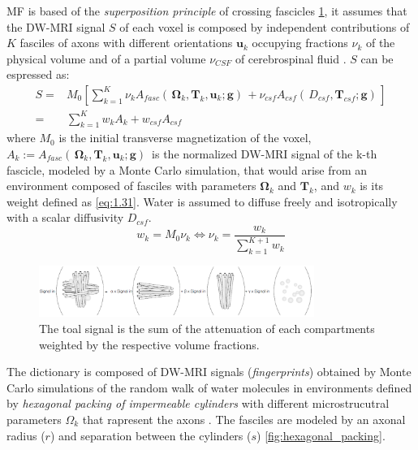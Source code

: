 MF is based of the \emph{superposition principle} of crossing fascicles \ref{fig:superposition}, it assumes that the DW-MRI signal $S$ of each voxel is composed by independent contributions of $K$ fasciles of axons with different orientations $\mathbf{u}_k$ occupying fractions $\nu_k$ of the physical volume and of a partial volume $\nu_{CSF}$ of cerebrospinal fluid \cite{rensonnet2019towards}. $S$ can be espressed as:
 \begin{equation}
  \begin{aligned}
   S ={} & M_0 \left[ \sum_{k=1}^{K} \nu_k A_{fasc} ( \,\mathbf{\Omega}_k,\mathbf{T}_k,\mathbf{u}_k;\mathbf{g}) \, + \nu_{csf} A_{csf}( \,D_{csf}, \mathbf{T}_{csf};\mathbf{g}) \, \right] \\
    = & \sum_{k=1}^{K} w_k A_k + w_{csf}A_{csf} 
  \end{aligned}
 \end{equation}
 where $M_0$ is the initial transverse magnetization of the voxel, $A_k := A_{fasc} ( \,\mathbf{\Omega}_k,\mathbf{T}_k,\mathbf{u}_k;\mathbf{g}) \,$ is the normalized DW-MRI signal of the k-th fascicle, modeled by a Monte Carlo simulation, that would arise from an environment composed of fasciles with parameters $\mathbf{\Omega}_k$ and $\mathbf{T}_k$, and $w_k$ is its weight defined as \ref{eq:1.31}. Water is assumed to diffuse freely and isotropically with a scalar diffusivity $D_{csf}$.
 \begin{equation}\label{eq:1.31}
   w_k = M_0\nu_k \iff \nu_k = \frac{w_k}{\sum_{k=1}^{K+1} w_k}
 \end{equation}

  \begin{figure}[h]
   \centering
   \includegraphics[width=0.8\textwidth]{images/superPosition.png}
   \caption{The toal signal is the sum of the attenuation of each compartments weighted by the respective volume fractions. \cite{rensonnet2015}}
   \label{fig:superposition}
 \end{figure}

 The dictionary is composed of DW-MRI signals (\emph{fingerprints}) obtained by Monte Carlo simulations of the random walk of water molecules in environments defined by \emph{hexagonal packing of impermeable cylinders} with different microstrucutral parameters $\Omega_k$ that rapresent the axons \cite{rensonnet2019towards}. The fasciles are modeled by an axonal radius ($r$) and separation between the cylinders ($s$) \ref{fig:hexagonal_packing}.

